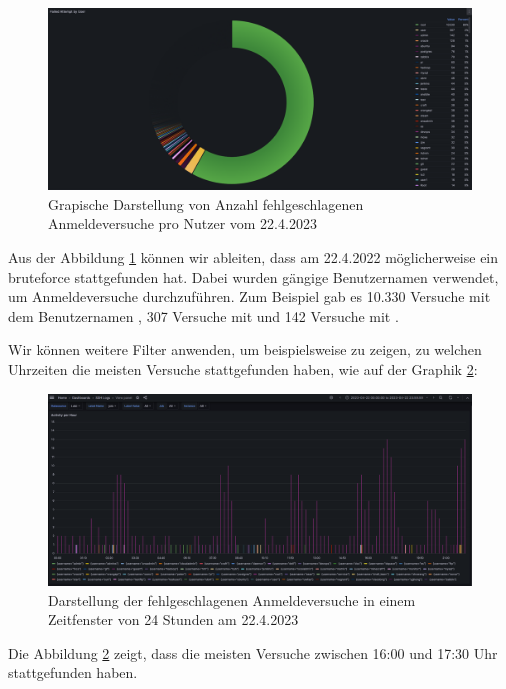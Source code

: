 \newpage
{}
\thispagestyle{lscape}
\begin{landscape}
    \begin{figure}[H]
        \centerline{\includegraphics[width=1.7\textwidth]{assets/Failed_pro_user.png}}
        \caption[Grapische Darstellung von Anzahl fehlgeschlagenen Anmeldeversuche pro Nutzer vom 22.4.2023]
        {Grapische Darstellung von Anzahl fehlgeschlagenen Anmeldeversuche pro Nutzer vom 22.4.2023}
        \label{fig:Zeistspanne_22.4}
        \centering
    \end{figure}
Aus der Abbildung \ref{fig:Zeistspanne_22.4} können wir ableiten, dass am 22.4.2022 möglicherweise ein \gls{bruteforce} stattgefunden hat. Dabei wurden gängige Benutzernamen verwendet, um Anmeldeversuche durchzuführen. Zum Beispiel gab es 10.330 Versuche mit dem Benutzernamen , 307 Versuche mit  und 142 Versuche mit .
\end{landscape}
\restoregeometry

\newpage
{}
\thispagestyle{lscape}
\begin{landscape}
  Wir können weitere Filter anwenden, um beispielsweise zu zeigen, zu welchen Uhrzeiten die meisten Versuche stattgefunden haben, wie auf der Graphik \ref{fig:Zeistfenster_22.4}:
    \begin{figure}[H]
        \centerline{\includegraphics[width=1.6\textwidth]{assets/activityperhour.png}}
        \caption[Darstellung der fehlgeschlagenen Anmeldeversuche in einem Zeitfenster von 24 Stunden am 22.4.2023]
        {Darstellung der fehlgeschlagenen Anmeldeversuche in einem Zeitfenster von 24 Stunden am 22.4.2023}
        \label{fig:Zeistfenster_22.4}
        \centering
    \end{figure}
  Die Abbildung \ref{fig:Zeistfenster_22.4} zeigt, dass die meisten Versuche zwischen 16:00 und 17:30 Uhr stattgefunden haben.
\end{landscape}
\restoregeometry

